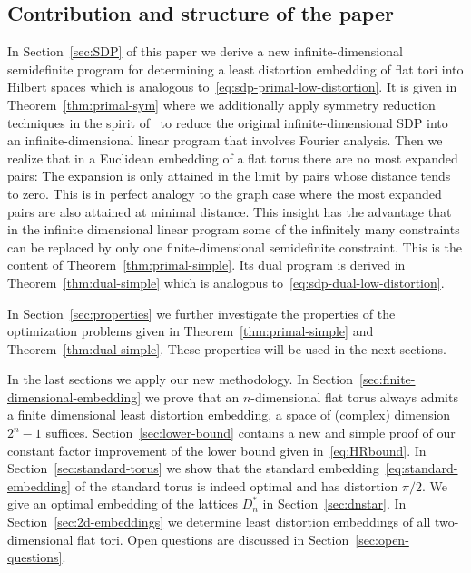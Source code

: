\documentclass{amsart}
\begin{document}
%

\subsection{Contribution and structure of the paper}

In Section~\ref{sec:SDP} of this paper we derive a new
infinite-dimensional semidefinite program for determining a least
distortion embedding of flat tori into Hilbert spaces which is
analogous to~\eqref{eq:sdp-primal-low-distortion}. It is given in
Theorem~\ref{thm:primal-sym} where we additionally apply symmetry
reduction techniques in the spirit of~\cite{BachocGSV2012} to reduce
the original infinite-dimensional SDP into an infinite-dimensional
linear program that involves Fourier analysis. Then we realize that in
a Euclidean embedding of a flat torus there are no most expanded
pairs: The expansion is only attained in the limit by pairs whose
distance tends to zero. This is in perfect analogy to the graph case
where the most expanded pairs are also attained at minimal
distance. This insight has the advantage that in the infinite
dimensional linear program some of the infinitely many constraints can
be replaced by only one finite-dimensional semidefinite
constraint. This is the content of
Theorem~\ref{thm:primal-simple}. Its dual program is derived in
Theorem~\ref{thm:dual-simple} which is analogous
to~\eqref{eq:sdp-dual-low-distortion}.

In Section~\ref{sec:properties} we further investigate the properties
of the optimization problems given in Theorem~\ref{thm:primal-simple}
and Theorem~\ref{thm:dual-simple}. These properties will be
used in the next sections.

In the last sections we apply our new methodology. In
Section~\ref{sec:finite-dimensional-embedding} we prove that an
$n$-dimensional flat torus always admits a finite dimensional least
distortion em\-bedding, a space of (complex) dimension $2^{n}-1$
suffices. Section~\ref{sec:lower-bound} contains a new and simple
proof of our constant factor improvement of the lower bound given
in~\eqref{eq:HRbound}. In Section~\ref{sec:standard-torus} we show
that the standard embedding~\eqref{eq:standard-embedding} of the
standard torus is indeed optimal and has distortion $\pi/2$. We give
an optimal embedding of the lattices $D_n^*$ in
Section~\ref{sec:dnstar}. In Section~\ref{sec:2d-embeddings} we
determine least distortion embeddings of all two-dimensional flat
tori. Open questions are discussed in
Section~\ref{sec:open-questions}.
\end{document}
